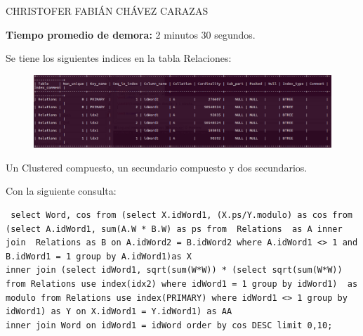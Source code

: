 \documentclass[a4paper,12pt]{article}
\begin{document}
\begin{LARGE}
 CHRISTOFER FABIÁN CHÁVEZ CARAZAS
\end{LARGE}

\textbf{Tiempo promedio de demora: } 2 minutos 30 segundos.

Se tiene los siguientes indices en la tabla Relaciones:

\begin{figure}[h]
 \includegraphics[scale=0.5]{1.eps}
\end{figure}

Un Clustered compuesto, un secundario compuesto y dos secundarios.

Con la siguiente consulta:

\begin{lstlisting}
 select Word, cos from (select X.idWord1, (X.ps/Y.modulo) as cos from 
(select A.idWord1, sum(A.W * B.W) as ps from  Relations  as A inner join  Relations as B on A.idWord2 = B.idWord2 where A.idWord1 <> 1 and B.idWord1 = 1 group by A.idWord1)as X 
inner join (select idWord1, sqrt(sum(W*W)) * (select sqrt(sum(W*W)) from Relations use index(idx2) where idWord1 = 1 group by idWord1)  as modulo from Relations use index(PRIMARY) where idWord1 <> 1 group by idWord1) as Y on X.idWord1 = Y.idWord1) as AA 
inner join Word on idWord1 = idWord order by cos DESC limit 0,10;
\end{lstlisting}
\end{document}
